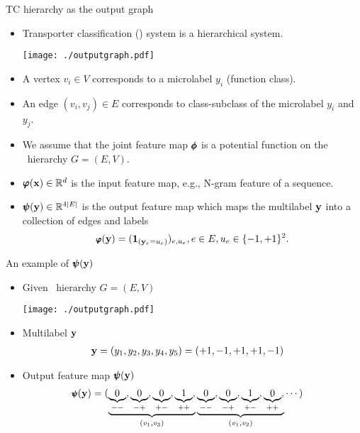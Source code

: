 \documentclass[first=dgreen,second=purple,logo=yellowexc]{aaltoslides}
\begin{document}
\begin{frame}{TC hierarchy as the output graph}
	\begin{itemize}\footnotesize
		\item Transporter classification (\tc) system is a hierarchical system.
		\begin{center}
			\texttt{[image: ./outputgraph.pdf]}
		\end{center}
		\item A vertex $v_i\in V$ corresponds to a microlabel $y_i$ (function class).
		\item An edge $(v_i,v_j)\in E$ corresponds to class-subclass of the microlabel $y_i$ and $y_j$.
		\item We assume that the joint feature map $\pmb \phi$ is a potential function on the \tc\ hierarchy $G=(E,V)$.
		\item $\pmb \varphi(\mathbf {x})\in\mathbb{R}^d$ is the input feature map, e.g., N-gram feature of a sequence.
		\item $\pmb \psi(\mathbf {y})\in\mathbb{R}^{4|E|}$ is the output feature map which maps the multilabel $\mathbf {y}$ into a collection of edges and labels
		\begin{align*}\footnotesize
			\pmb \varphi(\mathbf {y}) = (\mathbf {1}_{(\mathbf {y}_e=u_{e})})_{e,u_e}, e\in E,u_e\in\{-1,+1\}^2.
		\end{align*}
	\end{itemize}
\end{frame}

\begin{frame}{An example of $\pmb \psi(\mathbf {y})$}
	\begin{itemize}\footnotesize
		\item Given \tc\ hierarchy $G=(E,V)$
		\begin{center}
			\texttt{[image: ./outputgraph.pdf]}
		\end{center}
		\item Multilabel $\mathbf {y}$
		\begin{align*}
			\mathbf {y}&=(y_1,y_2,y_3,y_4,y_5)=(+1,-1,+1,+1,-1)
		\end{align*}
		\item Output feature map $\pmb \psi(\mathbf {y})$
		\begin{align*}\footnotesize
			\pmb \psi(\mathbf {y}) &= ( \underbrace{\underbrace{0}_{--}, \underbrace{0}_{-+}, \underbrace{0}_{+-}, \underbrace{1}_{++},}_{(v_1,v_3)} 
			\underbrace{\underbrace{0}_{--}, \underbrace{0}_{-+}, \underbrace{1}_{+-}, \underbrace{0}_{++},}_{(v_1,v_2)}\cdots)
		\end{align*}
	\end{itemize}
\end{frame}
\end{document}
